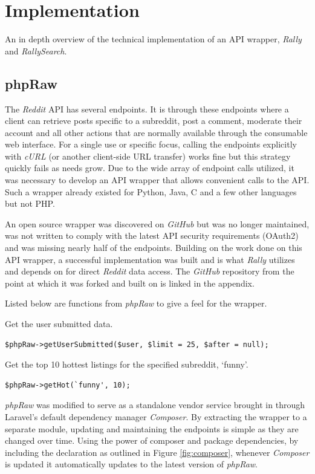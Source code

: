 \documentclass[msc,oneside]{ubcthesis}%
\begin{document}
\chapter{Implementation}
An in depth overview of the technical implementation of an API wrapper, \textit{Rally} and \textit{RallySearch}.
\section{phpRaw}
The \textit{Reddit} API has several endpoints. It is through these endpoints where a client can retrieve posts specific to a subreddit, post a comment, moderate their account and all other actions that are normally available through the consumable web interface. For a single use or specific focus, calling the endpoints explicitly with \textit{cURL} (or another client-side URL transfer) works fine but this strategy quickly fails as needs grow. Due to the wide array of endpoint calls utilized, it was necessary to develop an API wrapper that allows convenient calls to the API. Such a wrapper already existed for Python, Java, C and a few other languages but not PHP.
\par
An open source wrapper was discovered on \textit{GitHub} but was no longer maintained, was not written to comply with the latest API security requirements (OAuth2) and was missing nearly half of the endpoints. Building on the work done on this API wrapper, a successful implementation was built and is what \textit{Rally} utilizes and depends on for direct \textit{Reddit} data access. The \textit{GitHub} repository from the point at which it was forked and built on is linked in the appendix.
\par 
Listed below are functions from \textit{phpRaw} to give a feel for the wrapper.
\par
Get the user submitted data.
\begin{lstlisting}
$phpRaw->getUserSubmitted($user, $limit = 25, $after = null);
\end{lstlisting}

Get the top 10 hottest listings for the specified subreddit, `funny'.
\begin{lstlisting}
$phpRaw->getHot(`funny', 10);
\end{lstlisting}
\par
\textit{phpRaw} was modified to serve as a standalone vendor service brought in through Laravel's default dependency manager \textit{Composer}. By extracting the wrapper to a separate module, updating and maintaining the endpoints is simple as they are changed over time. Using the power of composer and package dependencies, by including the declaration as outlined in Figure \ref{fig:composer}, whenever \textit{Composer} is updated it automatically updates to the latest version of \textit{phpRaw}.
\end{document}
